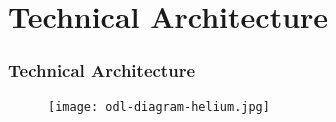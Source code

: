 \section{Technical Architecture}

\begin{frame}
\frametitle{Technical Architecture}

\begin{center}
  \begin{figure}
    \texttt{[image: odl-diagram-helium.jpg]}
  \end{figure}
\end{center}

\end{frame}
